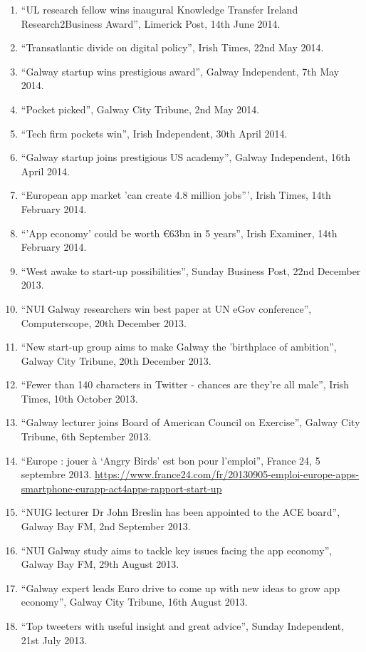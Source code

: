 \documentclass[10pt,a4paper]{res} %
\begin{document}
\begin{resume}
{\begin{enumerate}
\item ``UL research fellow wins inaugural Knowledge Transfer Ireland Research2Business Award'', Limerick Post, 14th June 2014.
\item ``Transatlantic divide on digital policy'', Irish Times, 22nd May 2014.
\item ``Galway startup wins prestigious award'', Galway Independent, 7th May 2014.
\item ``Pocket picked'', Galway City Tribune, 2nd May 2014.
\item ``Tech firm pockets win'', Irish Independent, 30th April 2014.
\item ``Galway startup joins prestigious US academy'', Galway Independent, 16th April 2014.
\item ``European app market 'can create 4.8 million jobs''', Irish Times, 14th February 2014.
\item ``'App economy' could be worth \euro{}63bn in 5 years'', Irish Examiner, 14th February 2014.
\item ``West awake to start-up possibilities'', Sunday Business Post, 22nd December 2013.
\item ``NUI Galway researchers win best paper at UN eGov conference'', Computerscope, 20th December 2013.
\item ``New start-up group aims to make Galway the 'birthplace of ambition'', Galway City Tribune, 20th December 2013.
\item ``Fewer than 140 characters in Twitter - chances are they're all male'', Irish Times, 10th October 2013.
\item ``Galway lecturer joins Board of American Council on Exercise'', Galway City Tribune, 6th September 2013.
\item ``Europe : jouer à `Angry Birds' est bon pour l'emploi'', France 24, 5 septembre 2013. \url{https://www.france24.com/fr/20130905-emploi-europe-apps-smartphone-eurapp-act4apps-rapport-start-up}
\item ``NUIG lecturer Dr John Breslin has been appointed to the ACE board'', Galway Bay FM, 2nd September 2013.
\item ``NUI Galway study aims to tackle key issues facing the app economy'', Galway Bay FM, 29th August 2013.
\item ``Galway expert leads Euro drive to come up with new ideas to grow app economy'', Galway City Tribune, 16th August 2013.
\item ``Top tweeters with useful insight and great advice'', Sunday Independent, 21st July 2013.

\end{enumerate}}
\end{resume}
\end{document}
